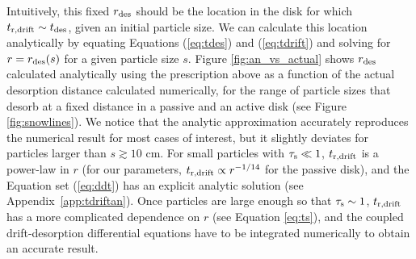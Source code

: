 \documentclass[apj]{emulateapj}
\newcommand{\App}[1]{Appendix~\ref{#1}}
\newcommand{\emgr}[1]{\emph{ \color{gray} #1}}
\begin{document}
Intuitively, this fixed $r_{\rm des}$ should be the location in the disk for which $t_{\rm r, drift} \sim t_{\rm des}$, given an initial particle size. We can calculate this location analytically by equating Equations (\ref{eq:tdes}) and (\ref{eq:tdrift}) and solving for $r=r_{\rm des}(s)$ for a given particle size $s$. Figure \ref{fig:an_vs_actual} shows $r_{\rm des}$ calculated analytically using the prescription above as a function of the actual desorption distance calculated numerically, for the range of particle sizes that desorb at a fixed distance in a passive and an active disk (see Figure \ref{fig:snowlines}). We notice that the analytic approximation accurately reproduces the numerical result for most cases of interest, but it slightly deviates for particles larger than $s \gtrsim10$ cm. For small particles with $\tau_{\rm s} \ll 1$, $t_{\rm r, drift}$ is a power-law in $r$ (for our parameters, $t_{\rm r, drift} \propto r^{-1/14}$ for the passive disk), and the Equation set (\ref{eq:ddt}) has an explicit analytic solution (see \App{app:tdriftan}). Once particles are large enough so that $\tau_{\rm s} \sim 1$, $t_{\rm r, drift}$ has a more complicated dependence on $r$ (see Equation \ref{eq:ts}), and the coupled drift-desorption differential equations have to be integrated numerically to obtain an accurate result. 





\end{document}
